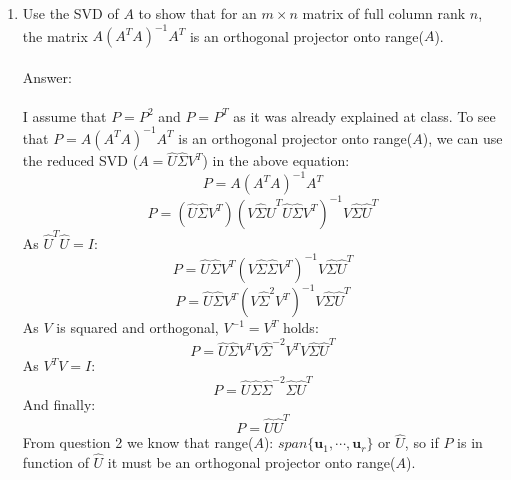 \documentclass{article}
\renewcommand{\vec}[1]{\mathbf{#1}}
\begin{document}
\begin{enumerate}
\item Use the SVD of $A$ to show that for an $m \times n$ matrix of full column rank $n$, the matrix $A (A^TA)^{-1} A^T$ is an orthogonal
  projector onto range($A$).\\
\\
Answer:\\
\\
I assume that $P=P^2$ and $P=P^T$ as it was already explained at class.  To see that $P=A(A^TA)^{-1}A^T$ is an orthogonal projector onto range($A$), we can use the reduced SVD ($A=\hat{U}\hat{\Sigma}V^T$) in the above equation:
$$P=A(A^TA)^{-1}A^T$$
$$P=(\hat{U}\hat{\Sigma}V^T)(V\hat{\Sigma}\hat{U}^T\hat{U}\hat{\Sigma}V^T )^{-1}V\hat{\Sigma}\hat{U}^T$$
As $\hat{U}^T\hat{U}=I$:
$$P=\hat{U}\hat{\Sigma}V^T(V\hat{\Sigma}\hat{\Sigma}V^T )^{-1}V\hat{\Sigma}\hat{U}^T$$
$$P=\hat{U}\hat{\Sigma}V^T(V\hat{\Sigma}^2V^T )^{-1}V\hat{\Sigma}\hat{U}^T$$
As $V$ is squared and orthogonal, $V^{-1}=V^T$ holds:
$$P=\hat{U}\hat{\Sigma}V^TV\hat{\Sigma}^{-2}V^TV\hat{\Sigma}\hat{U}^T$$
As $V^TV=I$:
$$P=\hat{U}\hat{\Sigma}\hat{\Sigma}^{-2}\hat{\Sigma}\hat{U}^T$$
And finally:
$$P=\hat{U}\hat{U}^T$$
From question 2 we know that range($A$): $span\{\vec{u}_1,\cdots,\vec{u}_r\}$ or $\hat{U}$, so if $P$ is in function of $\hat{U}$ it must be an orthogonal projector onto range($A$).
  
  
\end{enumerate}
\end{document}
